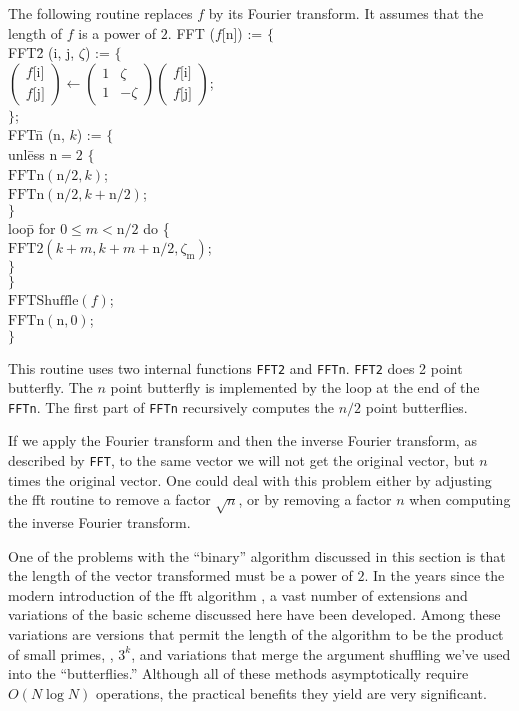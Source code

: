 The following routine replaces $f$ by its Fourier transform.  It
assumes that the length of $f$ is a power of $2$.
\begindsacode
FFT ($f$[n]) := $\{$ \\
\> FFT\=2 (i, j, $\zeta$) := $\{$ \\
\>\> $\left(\!\!\!\begin{array}{c}f\mbox{[i]}\\f\mbox{[j]}\end{array}\!\!\!\right)
  \leftarrow \left(\!\!\!\begin{array}{cc}1 & \zeta\\ 1 & -\zeta\end{array}\!\!\!\right)
  \left(\!\!\!\begin{array}{c}f\mbox{[i]}\\f\mbox{[j]}\end{array}\!\!\!\right)$;\\
\>\> $\}$; \\
\> FFT\=n (n, $k$) := $\{$ \\
\>\> unl\=ess $\mbox{n} = 2$ $\{$ \\
\>\>\> $\mbox{FFTn}(\mbox{n}/2, k)$;\\
\>\>\> $\mbox{FFTn}(\mbox{n}/2, k + \mbox{n}/2)$;\\
\>\>\> $\}$\\
\>\> loo\=p for $0 \le m < \mbox{n}/2$ do \{ \\
\>\>\> $\mbox{FFT2}(k+m, k+m+\mbox{n}/2, \zeta_{\mbox{m}})$; \\
\>\>\> $\}$ \\
\>\> $\}$ \\
\> $\mbox{FFTShuffle}(f)$; \\
\> $\mbox{FFTn}(\mbox{n}, 0)$; \\
\> $\}$
\enddsacode

\noindent
This routine uses two internal functions {\tt FFT2} and {\tt FFTn}.
{\tt FFT2} does 2 point butterfly.  The $n$ point butterfly is
implemented by the loop at the end of the {\tt FFTn}.  The first part
of {\tt FFTn} recursively computes the $n/2$ point butterflies.  

If we apply the Fourier transform and then the inverse Fourier
transform, as described by {\tt FFT}, to the same vector we will not
get the original vector, but $n$ times the original vector.  One
could deal with this problem either by adjusting the {\sc fft} routine
to remove a factor $\sqrt{n}$, or by removing a factor $n$ when
computing the inverse Fourier transform.

\medskip
One of the problems with the ``binary'' algorithm discussed in this
section is that the length of the vector transformed must be a power
of $2$.  In the years since the modern introduction of the {\sc fft}
algorithm \cite{Cooley1965-bp}, a vast number of extensions and variations
of the basic scheme discussed here have been developed.  Among these
variations are versions that permit the length of the algorithm to be
the product of small primes, \eg, $3^k$, and variations that merge the
argument shuffling we've used into the ``butterflies.''  Although all
of these methods asymptotically require $O(N \log N)$ operations, the
practical benefits they yield are very significant.

